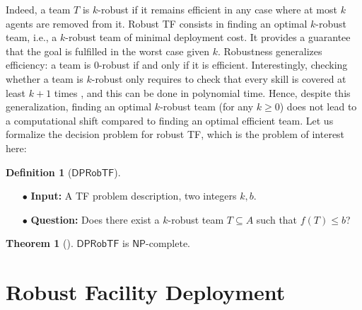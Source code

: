 \documentclass[conference]{IEEEtran}
\newcommand{\dprobtf}{\ensuremath{\mathsf{DPRobTF}}}
\theoremstyle{definition}
\newtheorem{definition}{Definition}
\newtheorem{theorem}{Theorem}
\begin{document}
Indeed, a team $T$ is $k$-robust if it remains efficient in any
case where at most $k$ agents are removed from it.
Robust TF consists in finding an optimal $k$-robust team, i.e., a
$k$-robust team of minimal deployment cost. It provides a
guarantee that the goal is fulfilled in the worst case given $k$.
Robustness generalizes efficiency: a team is $0$-robust if and only if it is efficient.
Interestingly,
checking whether a team is $k$-robust only requires to
check that every skill is covered at least $k + 1$ times \cite{Okimoto2015}, and this can be done in polynomial time.
Hence, despite this generalization, finding an optimal $k$-robust team (for any $k \geq 0$) does not lead to a computational shift
compared to finding an optimal efficient team. Let us formalize the decision problem for robust TF, which is the problem of interest here:
\begin{definition}[\dprobtf]\hfill
	\begin{itemize}
		\item[$\bullet$] \textbf{Input:} A TF problem description, two integers $k, b$.
		\item[$\bullet$] \textbf{Question:} Does there exist a $k$-robust team $T \subseteq A$ such that $f(T) \leq b$?
	\end{itemize}
	\label{def:decision problem}
\end{definition}

\begin{theorem}[\cite{Okimoto2015}]
	\dprobtf{} is $\mathsf{NP}$-complete.
	\label{prop:TORTF}
\end{theorem}


\section{Robust Facility Deployment}
\end{document}
